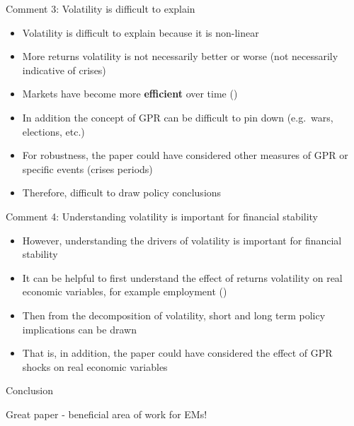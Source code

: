 \documentclass[
  12pt,
  ignorenonframetext,
]{beamer}
\providecommand{\tightlist}{%
  \setlength{\itemsep}{0pt}\setlength{\parskip}{0pt}}
\begin{document}
\begin{frame}[s]{Comment 3: Volatility is difficult to explain}
\label{comment-3-volatility-is-difficult-to-explain}

\begin{itemize}
\tightlist
\item
  Volatility is difficult to explain because it is non-linear
\item
  More returns volatility is not necessarily better or worse (not
  necessarily indicative of crises)
\item
  Markets have become more \textbf{efficient} over time
  ()
\item
  In addition the concept of GPR can be difficult to pin down
  (e.g.~wars, elections, etc.)
\item
  For robustness, the paper could have considered other measures of GPR
  or specific events (crises periods)
\item
  Therefore, difficult to draw policy conclusions
\end{itemize}
\end{frame}

\begin{frame}[s]{Comment 4: Understanding volatility is important for
financial stability}
\label{comment-4-understanding-volatility-is-important-for-financial-stability}

\begin{itemize}
\tightlist
\item
  However, understanding the drivers of volatility is important for
  financial stability
\item
  It can be helpful to first understand the effect of returns volatility
  on real economic variables, for example employment
  ()
\item
  Then from the decomposition of volatility, short and long term policy
  implications can be drawn
\item
  That is, in addition, the paper could have considered the effect of
  GPR shocks on real economic variables
\end{itemize}
\end{frame}

\begin{frame}{Conclusion}
\label{conclusion}
\center

\large Great paper - beneficial area of work for EMs!
\end{frame}
\end{document}
